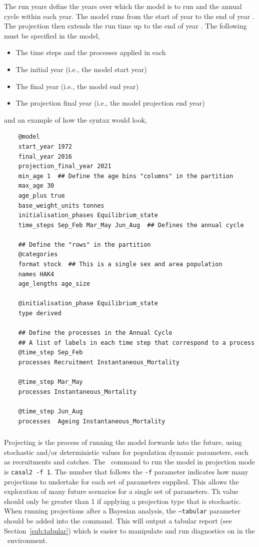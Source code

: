 The run years define the years over which the model is to run and the annual cycle within each year. The model runs from the start of year  to the end of year . The projection then extends the run time up to the end of year . The following must be specified in the model,
\begin{itemize}
  \item The time steps and the processes applied in each
  \item The initial year (i.e., the model start year)
  \item The final year (i.e., the model end year)
  \item The projection final year (i.e., the model projection end year)
\end{itemize}

and an example of how the syntax would look,

{\small{\begin{verbatim}
	@model
	start_year 1972
	final_year 2016
	projection_final_year 2021
	min_age 1  ## Define the age bins "columns" in the partition
	max_age 30
	age_plus true
	base_weight_units tonnes
	initialisation_phases Equilibrium_state
	time_steps Sep_Feb Mar_May Jun_Aug  ## Defines the annual cycle

	## Define the "rows" in the partition
	@categories
	format stock  ## This is a single sex and area population
	names HAK4
	age_lengths age_size

	@initialisation_phase Equilibrium_state
	type derived

	## Define the processes in the Annual Cycle
	## A list of labels in each time step that correspond to a process
	@time_step Sep_Feb
	processes Recruitment Instantaneous_Mortality

	@time_step Mar_May
	processes Instantaneous_Mortality

	@time_step Jun_Aug
	processes  Ageing Instantaneous_Mortality
\end{verbatim}}}


\subsubsection{}\label{sec:projection}

Projecting is the process of running the model forwards into the future, using stochastic and/or deterministic values for population dynamic parameters, such as recruitments and catches. The \CNAME\ command to run the model in projection mode is \texttt{casal2 -f 1}. The number that follows the \texttt{-f} parameter indicates how many projections to undertake for each set of parameters supplied. This allows the exploration of many future scenarios for a single set of parameters. Th value should only be greater than 1 if applying a projection type that is stochastic. When running projections after a Bayesian analysis, the \texttt{--tabular} parameter should be added into the command. This will output a tabular report (see Section~\ref{sub:tabular}) which is easier to manipulate and run diagnostics on in the \R\ environment.

